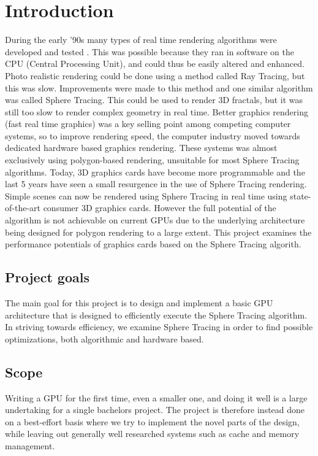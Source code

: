 \chapter{Introduction} 	
	During the early '90s many types of real time rendering algorithms were 
	developed and tested \cite{TODO}. This was possible because they ran in 
	software on the CPU (Central Processing Unit), and could thus be easily altered and enhanced. 
	Photo realistic rendering could be done using a method called Ray Tracing, 
	but this was slow\cite{TODO}. Improvements were made to this method and 
	one similar algorithm was called Sphere Tracing. This could be used to render
	3D fractals\cite{TODO}, but it was still too slow to render complex
	geometry in real time\cite{TODO}. Better graphics rendering (fast real 
	time graphics) was a key selling point among competing computer systems, so 
	to improve rendering speed, the computer industry moved towards dedicated 
	hardware based 	graphics rendering\cite{TODO}. These systems was almost 
	exclusively using polygon-based rendering, unsuitable for most Sphere Tracing 
	algorithms. Today, 3D graphics cards have become more programmable and the 
	last 5 years have seen a small resurgence in the use of Sphere Tracing 
	rendering\cite{TODO}. Simple scenes can now be rendered using Sphere Tracing 
	in real time using state-of-the-art consumer 3D graphics cards. However the 
	full potential of the algorithm is not achievable on current GPUs 
	due to the underlying architecture being designed for polygon rendering to a 
	large extent\cite{TODO}. This project examines the performance potentials of 
	graphics cards based on the Sphere Tracing algorith. 
	
	\section{Project goals}
	
		The main goal for this project is to design and implement a basic GPU 
		architecture that is designed to efficiently execute the Sphere Tracing 
		algorithm. In striving towards efficiency, we examine Sphere Tracing in 
		order to find possible optimizations, both algorithmic and hardware 
		based.
		
	\section{Scope}

		Writing a GPU for the first time, even a smaller one, and doing it well is
		a large undertaking for a single bachelors project. The project is therefore
		instead done on a best-effort basis where we try to implement the novel parts
		of the design, while leaving out generally well researched systems such as
		cache and memory management. 
